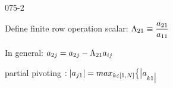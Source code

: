 \begin{mitframe}{075-2}
\begin{listone}
	\item Define finite row operation scalar: $\debroglie_{21}\equiv\dfrac{\activity_{21}}{\activity_{11}}$
    \item In general: $\activity_{2j}=\activity_{2j}-\debroglie_{21}\activity_{\state{j}}$
 \item partial pivoting $ :|\activity_{j1}|=max_{\thermcond\varepsilon[1,\nummoles]}\big\{\big|\activity_{\thermcond{1}\big|}$
\end{listone}    
\end{mitframe}